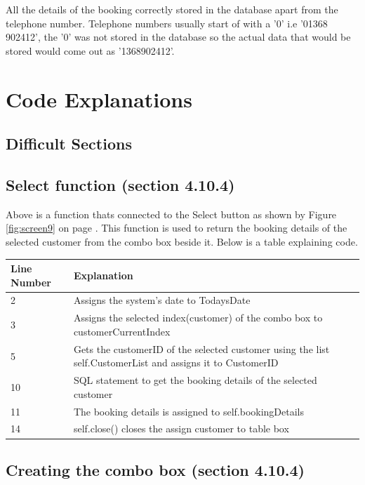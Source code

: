 All the details of the booking correctly stored in the database apart from the telephone number. Telephone numbers usually start of with a '0' i.e '01368 902412', the '0' was not stored in the database so the actual data that would be stored would come out as '1368902412'.


\section{Code Explanations}

\subsection{Difficult Sections}

\newpage
\subsection{Select function (section 4.10.4)}

Above is a function thats connected to the Select button as shown by Figure \ref{fig:screen9} on page \pageref{fig:screen9}. This function is used to return the booking details of the selected customer from the combo box beside it. Below is a table explaining code.


\begin{center}
\begin{tabular}{|p{5cm}|p{7.5cm}|}
\hline
\textbf{Line Number} & \textbf{Explanation} \\ \hline
2 & Assigns the system's date to TodaysDate \\ \hline
3 & Assigns the selected index(customer) of the combo box to customerCurrentIndex \\ \hline
5 & Gets the customerID of the selected customer using the list self.CustomerList and assigns it to CustomerID \\ \hline
10 & SQL statement to get the booking details of the selected customer  \\ \hline
11 & The booking details is assigned to self.bookingDetails \\ \hline
14 & self.close() closes the assign customer to table box \\ \hline

\end{tabular}
\end{center}
\newpage
\subsection{Creating the combo box (section 4.10.4)}

